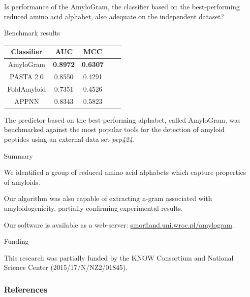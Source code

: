 \documentclass{beamer}\usepackage[]{graphicx}\usepackage[]{color}
\begin{document}
\begin{frame}{}
Is performance of the AmyloGram, the classifier based on the best-performing reduced amino acid alphabet, also adequate on the independent dataset?
\end{frame}


\begin{frame}{Benchmark results}

\begin{table}[ht]
\centering

\begin{tabular}{ccccc}
  \toprule
Classifier & AUC & MCC \\ 
  \midrule
AmyloGram & \textbf{0.8972} & \textbf{0.6307} \\ 
  \rowcolor{white}PASTA 2.0\citep{walsh_pasta_2014} & 0.8550 & 0.4291  \\ 
   FoldAmyloid \citep{garbuzynskiy_foldamyloid:_2010} & 0.7351 & 0.4526  \\ 
  \rowcolor{white}APPNN \citep{familia_prediction_2015} & 0.8343 & 0.5823  \\ 
   \bottomrule
\end{tabular}
\end{table}

The predictor based on the best-performing alphabet, called AmyloGram, was benchmarked against the most popular tools for the detection of amyloid peptides using an external data set \textit{pep424}.

\end{frame}

\begin{frame}{Summary}

We identified a group of reduced amino acid alphabets which capture properties of amyloids. 

Our algorithm was also capable of extracting n-gram associated with amyloidogenicity, partially confirming experimental results.

Our software is available as a web-server: \url{smorfland.uni.wroc.pl/amylogram}.

\end{frame}

\begin{frame}{Funding}

This research was partially funded by the KNOW Consortium and National Science Center (2015/17/N/NZ2/01845).

\end{frame}



\begin{frame}[allowframebreaks]
        \frametitle{References}
  
  
\end{frame}  
\end{document}

